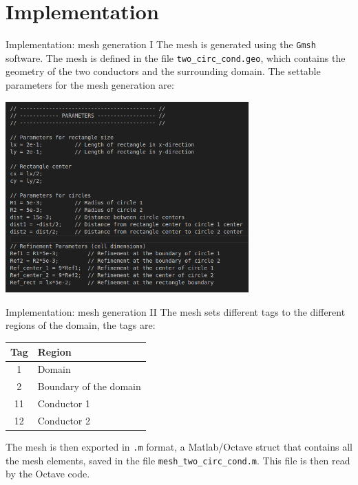 \documentclass[aspectratio=54,xcolor=dvipsnames]{beamer}
\begin{document}
\section{Implementation}
\begin{frame}{Implementation: mesh generation I}
    The mesh is generated using the \texttt{Gmsh} software. The mesh is defined in the file \texttt{two\_circ\_cond.geo}, which contains the geometry of the two conductors and the surrounding domain. The settable parameters for the mesh generation are:
    \begin{center}
         \includegraphics[width=0.7\textwidth]{Images/Gmsh_parameters.png}
    \end{center}
\end{frame}

\begin{frame}{Implementation: mesh generation II}
    The mesh sets different tags to the different regions of the domain, the tags are:
    \begin{center}
        \begin{tabular}{|c|l|}
            \hline
            Tag & Region \\
            \hline
            1 & Domain \\
            2 & Boundary of the domain \\
            11 & Conductor 1 \\
            12 & Conductor 2 \\
            \hline
        \end{tabular}
    \end{center}
    The mesh is then exported in \texttt{.m} format, a Matlab/Octave struct that contains all the mesh elements, saved in the file \texttt{mesh\_two\_circ\_cond.m}. This file is then read by the Octave code.
\end{frame}
\end{document}
